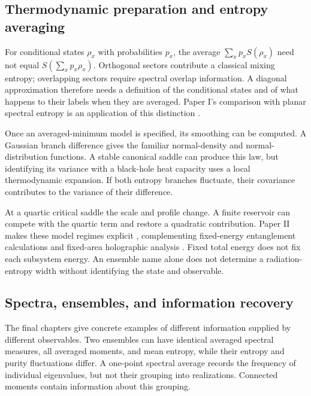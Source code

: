 \documentclass[11pt,letterpaper]{article}
\theoremstyle{plain}
\theoremstyle{definition}
\theoremstyle{remark}
\begin{document}
\subsection{Thermodynamic preparation and entropy averaging}
\label{subsec15:thermodynamics}

For conditional states $\rho_x$ with probabilities $p_x$, the average
$\sum_xp_x S(\rho_x)$ need not equal $S(\sum_xp_x\rho_x)$. Orthogonal
sectors contribute a classical mixing entropy; overlapping sectors require
spectral overlap information. A diagonal approximation therefore needs a
definition of the conditional states and of what happens to their labels
when they are averaged. Paper I's comparison with planar spectral entropy
is an application of this distinction \citep{wuebben2026paper1}.

Once an averaged-minimum model is specified, its smoothing can be computed.
A Gaussian branch difference gives the familiar normal-density and
normal-distribution functions. A stable canonical saddle can produce this
law, but identifying its variance with a black-hole heat capacity uses a
local thermodynamic expansion. If both entropy branches fluctuate, their
covariance contributes to the variance of their difference.

At a quartic critical saddle the scale and profile change. A finite
reservoir can compete with the quartic term and restore a quadratic
contribution. Paper II makes these model regimes explicit
\citep{wuebben2026paper2}, complementing fixed-energy entanglement
calculations \citep{murthysrednicki2019} and fixed-area holographic
analysis \citep{marolfwangwang2020}. Fixed total energy does not fix each
subsystem energy. An ensemble name alone does not determine a
radiation-entropy width without identifying the state and observable.

\subsection{Spectra, ensembles, and information recovery}
\label{subsec15:observables}

The final chapters give concrete examples of different information supplied
by different observables. Two ensembles can have identical averaged spectral
measures, all averaged moments, and mean entropy, while their entropy and
purity fluctuations differ. A one-point spectral average records the
frequency of individual eigenvalues, but not their grouping into
realizations. Connected moments contain information about this grouping.
\end{document}
